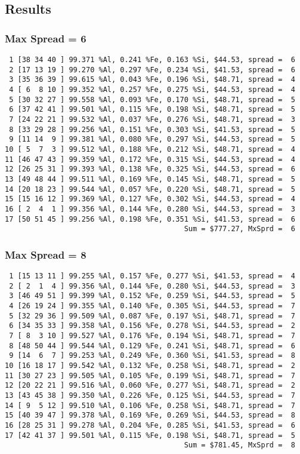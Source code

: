 \documentclass{article}
\begin{document}
\subsection{Results}
\subsubsection{Max Spread = 6}
\begin{verbatim}
 1 [38 34 40 ] 99.371 %Al, 0.241 %Fe, 0.163 %Si, $44.53, spread =  6
 2 [17 13 19 ] 99.270 %Al, 0.297 %Fe, 0.234 %Si, $41.53, spread =  6
 3 [35 36 39 ] 99.615 %Al, 0.043 %Fe, 0.196 %Si, $48.71, spread =  4
 4 [ 6  8 10 ] 99.352 %Al, 0.257 %Fe, 0.275 %Si, $44.53, spread =  4
 5 [30 32 27 ] 99.558 %Al, 0.093 %Fe, 0.170 %Si, $48.71, spread =  5
 6 [37 42 41 ] 99.501 %Al, 0.115 %Fe, 0.198 %Si, $48.71, spread =  5
 7 [24 22 21 ] 99.532 %Al, 0.037 %Fe, 0.276 %Si, $48.71, spread =  3
 8 [33 29 28 ] 99.256 %Al, 0.151 %Fe, 0.303 %Si, $41.53, spread =  5
 9 [11 14  9 ] 99.381 %Al, 0.080 %Fe, 0.297 %Si, $44.53, spread =  5
10 [ 5  7  3 ] 99.512 %Al, 0.188 %Fe, 0.212 %Si, $48.71, spread =  4
11 [46 47 43 ] 99.359 %Al, 0.172 %Fe, 0.315 %Si, $44.53, spread =  4
12 [26 25 31 ] 99.393 %Al, 0.138 %Fe, 0.325 %Si, $44.53, spread =  6
13 [49 48 44 ] 99.511 %Al, 0.169 %Fe, 0.145 %Si, $48.71, spread =  5
14 [20 18 23 ] 99.544 %Al, 0.057 %Fe, 0.220 %Si, $48.71, spread =  5
15 [15 16 12 ] 99.369 %Al, 0.127 %Fe, 0.302 %Si, $44.53, spread =  4
16 [ 2  4  1 ] 99.356 %Al, 0.144 %Fe, 0.280 %Si, $44.53, spread =  3
17 [50 51 45 ] 99.256 %Al, 0.198 %Fe, 0.351 %Si, $41.53, spread =  6
                                          Sum = $777.27, MxSprd =  6
\end{verbatim}
\subsubsection{Max Spread = 8}
\begin{verbatim}
 1 [15 13 11 ] 99.255 %Al, 0.157 %Fe, 0.277 %Si, $41.53, spread =  4
 2 [ 2  1  4 ] 99.356 %Al, 0.144 %Fe, 0.280 %Si, $44.53, spread =  3
 3 [46 49 51 ] 99.399 %Al, 0.152 %Fe, 0.259 %Si, $44.53, spread =  5
 4 [26 19 24 ] 99.355 %Al, 0.140 %Fe, 0.305 %Si, $44.53, spread =  7
 5 [32 29 36 ] 99.509 %Al, 0.087 %Fe, 0.197 %Si, $48.71, spread =  7
 6 [34 35 33 ] 99.358 %Al, 0.156 %Fe, 0.278 %Si, $44.53, spread =  2
 7 [ 8  3 10 ] 99.527 %Al, 0.176 %Fe, 0.194 %Si, $48.71, spread =  7
 8 [48 50 44 ] 99.544 %Al, 0.129 %Fe, 0.241 %Si, $48.71, spread =  6
 9 [14  6  7 ] 99.253 %Al, 0.249 %Fe, 0.360 %Si, $41.53, spread =  8
10 [16 18 17 ] 99.542 %Al, 0.132 %Fe, 0.258 %Si, $48.71, spread =  2
11 [30 27 23 ] 99.505 %Al, 0.105 %Fe, 0.199 %Si, $48.71, spread =  7
12 [20 22 21 ] 99.516 %Al, 0.060 %Fe, 0.277 %Si, $48.71, spread =  2
13 [43 45 38 ] 99.350 %Al, 0.226 %Fe, 0.125 %Si, $44.53, spread =  7
14 [ 9  5 12 ] 99.510 %Al, 0.106 %Fe, 0.258 %Si, $48.71, spread =  7
15 [40 39 47 ] 99.378 %Al, 0.169 %Fe, 0.269 %Si, $44.53, spread =  8
16 [28 25 31 ] 99.278 %Al, 0.204 %Fe, 0.285 %Si, $41.53, spread =  6
17 [42 41 37 ] 99.501 %Al, 0.115 %Fe, 0.198 %Si, $48.71, spread =  5
                                          Sum = $781.45, MxSprd =  8
\end{verbatim}
\end{document}
